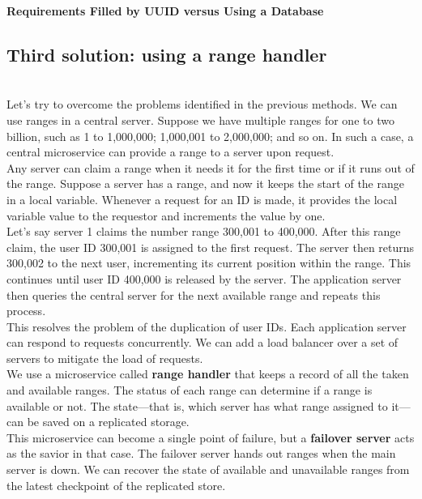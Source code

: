 \textbf{Requirements Filled by UUID versus Using a Database}

\begin{table}[htbp]
\centering
\small
{}
\caption{Requirements Filled by UUID versus Using a Database}
\end{table}

\subsection{Third solution: using a range handler}\label{iMi3LoN4xI7vQpNST0RAe}
\\
Let's try to overcome the problems identified in the previous methods. We can use ranges in a central server. Suppose we have multiple ranges for one to two billion, such as 1 to 1,000,000; 1,000,001 to 2,000,000; and so on. In such a case, a central microservice can provide a range to a server upon request.
\\
Any server can claim a range when it needs it for the first time or if it runs out of the range. Suppose a server has a range, and now it keeps the start of the range in a local variable. Whenever a request for an ID is made, it provides the local variable value to the requestor and increments the value by one.
\\
Let's say server 1 claims the number range 300,001 to 400,000. After this range claim, the user ID 300,001 is assigned to the first request. The server then returns 300,002 to the next user, incrementing its current position within the range. This continues until user ID 400,000 is released by the server. The application server then queries the central server for the next available range and repeats this process.
\\
This resolves the problem of the duplication of user IDs. Each application server can respond to requests concurrently. We can add a load balancer over a set of servers to mitigate the load of requests.
\\
We use a microservice called \textbf{range handler} that keeps a record of all the taken and available ranges. The status of each range can determine if a range is available or not. The state---that is, which server has what range assigned to it---can be saved on a replicated storage.
\\
This microservice can become a single point of failure, but a \textbf{failover server} acts as the savior in that case. The failover server hands out ranges when the main server is down. We can recover the state of available and unavailable ranges from the latest checkpoint of the replicated store.

